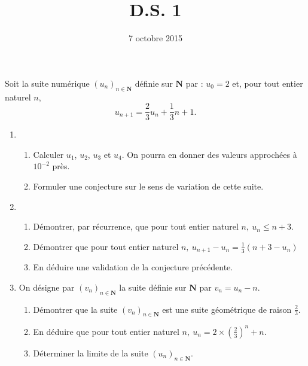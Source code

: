 \documentclass[a4paper,12pt,french]{article}
\title{D.S. 1}
\date{7 octobre 2015}
\newcommand{\N}{\mathbf{N}}
\renewcommand{\u}{(u_n)_{n\in\N}}
\begin{document}
\maketitle

\begin{Exercise}[number=1,title={9 points}]
  Soit la suite numérique $\u$ définie sur $\N$ par : $u_0 =2$ et, pour
  tout entier naturel $n$, \[ u_{n+1} = \frac23 u_n + \frac13 n +1. \]
  \begin{enumerate}
    \item \begin{enumerate}
        \item Calculer $u_1$, $u_2$, $u_3$ et $u_4$. On pourra en donner
          des valeurs approchées à $10^{-2}$ près.
        \item Formuler une conjecture sur le sens de variation de cette
          suite.
      \end{enumerate}
    \item \begin{enumerate}
        \item Démontrer, par récurrence, que pour tout entier naturel
          $n,\ u_n \leqslant n+3$.
        \item Démontrer que pour tout entier naturel $n,\ u_{n+1} - u_n
          = \frac13\left(n+3 - u_n\right)$
        \item En déduire une validation de la conjecture précédente.
      \end{enumerate}
    \item On désigne par $(v_n)_{n\in\N}$ la suite définie sur $\N$ par
      $v_n = u_n -n$.
      \begin{enumerate}
        \item Démontrer  que la suite $(v_n)_{n\in\N}$ est une suite
          géométrique de raison $\frac23$.
        \item En déduire que pour tout entier naturel $n,\ u_n =
          2\times \left(\frac23\right)^n + n$.
        \item Déterminer la limite de la suite $\u$.
      \end{enumerate}
  \end{enumerate}
\end{Exercise}
\end{document}
